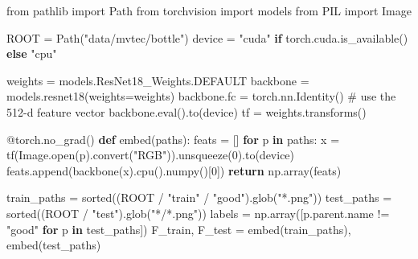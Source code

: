 \documentclass[
  letterpaper,
  DIV=11,
  numbers=noendperiod]{scrreprt}
\newenvironment{Shaded}{\begin{snugshade}}{\end{snugshade}}
\newcommand{\AttributeTok}[1]{\textcolor[rgb]{0.40,0.45,0.13}{#1}}
\newcommand{\BuiltInTok}[1]{\textcolor[rgb]{0.00,0.23,0.31}{#1}}
\newcommand{\CommentTok}[1]{\textcolor[rgb]{0.37,0.37,0.37}{#1}}
\newcommand{\ControlFlowTok}[1]{\textcolor[rgb]{0.00,0.23,0.31}{\textbf{#1}}}
\newcommand{\DecValTok}[1]{\textcolor[rgb]{0.68,0.00,0.00}{#1}}
\newcommand{\ImportTok}[1]{\textcolor[rgb]{0.00,0.46,0.62}{#1}}
\newcommand{\KeywordTok}[1]{\textcolor[rgb]{0.00,0.23,0.31}{\textbf{#1}}}
\newcommand{\NormalTok}[1]{\textcolor[rgb]{0.00,0.23,0.31}{#1}}
\newcommand{\OperatorTok}[1]{\textcolor[rgb]{0.37,0.37,0.37}{#1}}
\newcommand{\StringTok}[1]{\textcolor[rgb]{0.13,0.47,0.30}{#1}}
\begin{document}
\begin{Shaded}
\begin{Highlighting}[]
\ImportTok{from}\NormalTok{ pathlib }\ImportTok{import}\NormalTok{ Path}
\ImportTok{from}\NormalTok{ torchvision }\ImportTok{import}\NormalTok{ models}
\ImportTok{from}\NormalTok{ PIL }\ImportTok{import}\NormalTok{ Image}

\NormalTok{ROOT }\OperatorTok{=}\NormalTok{ Path(}\StringTok{"data/mvtec/bottle"}\NormalTok{)}
\NormalTok{device }\OperatorTok{=} \StringTok{"cuda"} \ControlFlowTok{if}\NormalTok{ torch.cuda.is\_available() }\ControlFlowTok{else} \StringTok{"cpu"}

\NormalTok{weights }\OperatorTok{=}\NormalTok{ models.ResNet18\_Weights.DEFAULT}
\NormalTok{backbone }\OperatorTok{=}\NormalTok{ models.resnet18(weights}\OperatorTok{=}\NormalTok{weights)}
\NormalTok{backbone.fc }\OperatorTok{=}\NormalTok{ torch.nn.Identity()           }\CommentTok{\# use the 512{-}d feature vector}
\NormalTok{backbone.}\BuiltInTok{eval}\NormalTok{().to(device)}
\NormalTok{tf }\OperatorTok{=}\NormalTok{ weights.transforms()}

\AttributeTok{@torch.no\_grad}\NormalTok{()}
\KeywordTok{def}\NormalTok{ embed(paths):}
\NormalTok{    feats }\OperatorTok{=}\NormalTok{ []}
    \ControlFlowTok{for}\NormalTok{ p }\KeywordTok{in}\NormalTok{ paths:}
\NormalTok{        x }\OperatorTok{=}\NormalTok{ tf(Image.}\BuiltInTok{open}\NormalTok{(p).convert(}\StringTok{"RGB"}\NormalTok{)).unsqueeze(}\DecValTok{0}\NormalTok{).to(device)}
\NormalTok{        feats.append(backbone(x).cpu().numpy()[}\DecValTok{0}\NormalTok{])}
    \ControlFlowTok{return}\NormalTok{ np.array(feats)}

\NormalTok{train\_paths }\OperatorTok{=} \BuiltInTok{sorted}\NormalTok{((ROOT }\OperatorTok{/} \StringTok{"train"} \OperatorTok{/} \StringTok{"good"}\NormalTok{).glob(}\StringTok{"*.png"}\NormalTok{))}
\NormalTok{test\_paths }\OperatorTok{=} \BuiltInTok{sorted}\NormalTok{((ROOT }\OperatorTok{/} \StringTok{"test"}\NormalTok{).glob(}\StringTok{"*/*.png"}\NormalTok{))}
\NormalTok{labels }\OperatorTok{=}\NormalTok{ np.array([p.parent.name }\OperatorTok{!=} \StringTok{"good"} \ControlFlowTok{for}\NormalTok{ p }\KeywordTok{in}\NormalTok{ test\_paths])}
\NormalTok{F\_train, F\_test }\OperatorTok{=}\NormalTok{ embed(train\_paths), embed(test\_paths)}
\end{Highlighting}
\end{Shaded}
\end{document}
